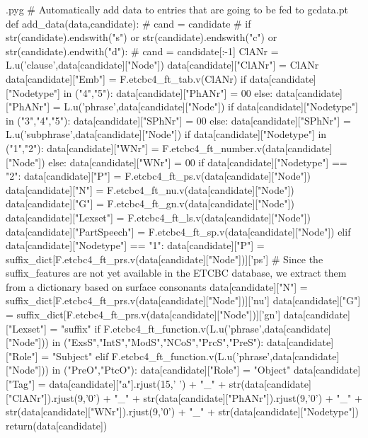 \documentclass{report}
\makeatletter
\newenvironment{python}{%
  \VerbatimEnvironment
  \minted@resetoptions
  \setkeys{minted@opt}{}
      \begin{VerbatimOut}{\jobname.pyg}}
{%
      \end{VerbatimOut}
      \minted@pygmentize{python}
      \DeleteFile{\jobname.pyg}}
\makeatother
\begin{document}
\begin{python}
# Automatically add data to entries that are going to be fed to gcdata.pt
def add_data(data,candidate):
#    cand = candidate
#    if str(candidate).endswith("s") or str(candidate).endswith("c") or str(candidate).endwith("d"):
#        cand = candidate[:-1]
    ClANr = L.u('clause',data[candidate]["Node"])
    data[candidate]["ClANr"] = ClANr
    data[candidate]["Emb"] = F.etcbc4_ft_tab.v(ClANr)
    if data[candidate]["Nodetype"] in ("4","5"):
        data[candidate]["PhANr"] = 00
    else:
        data[candidate]["PhANr"] = L.u('phrase',data[candidate]["Node"])
    if data[candidate]["Nodetype"] in ("3","4","5"):
        data[candidate]["SPhNr"] = 00
    else:
        data[candidate]["SPhNr"] = L.u('subphrase',data[candidate]["Node"])
    if data[candidate]["Nodetype"] in ("1","2"):
        data[candidate]["WNr"] = F.etcbc4_ft_number.v(data[candidate]["Node"])
    else:
        data[candidate]["WNr"] = 00
    if data[candidate]["Nodetype"] == "2":
        data[candidate]["P"] = F.etcbc4_ft_ps.v(data[candidate]["Node"])
        data[candidate]["N"] = F.etcbc4_ft_nu.v(data[candidate]["Node"])
        data[candidate]["G"] = F.etcbc4_ft_gn.v(data[candidate]["Node"])
        data[candidate]["Lexset"] = F.etcbc4_ft_ls.v(data[candidate]["Node"])
        data[candidate]["PartSpeech"] = F.etcbc4_ft_sp.v(data[candidate]["Node"])
    elif data[candidate]["Nodetype"] == "1":
        data[candidate]["P"] = suffix_dict[F.etcbc4_ft_prs.v(data[candidate]["Node"])]['ps']    # Since the suffix_features are not yet available in the ETCBC database, we extract them from a dictionary based on surface consonants
        data[candidate]["N"] = suffix_dict[F.etcbc4_ft_prs.v(data[candidate]["Node"])]['nu']
        data[candidate]["G"] = suffix_dict[F.etcbc4_ft_prs.v(data[candidate]["Node"])]['gn']
        data[candidate]["Lexset"] = "suffix"
        if F.etcbc4_ft_function.v(L.u('phrase',data[candidate]["Node"])) in ("ExsS","IntS","ModS","NCoS","PrcS","PreS"):
            data[candidate]["Role"] = "Subject"
        elif F.etcbc4_ft_function.v(L.u('phrase',data[candidate]["Node"])) in ("PreO","PtcO"):
            data[candidate]["Role"] = "Object"
    data[candidate]["Tag"] = data[candidate]["a"].rjust(15,' ') + "_" + str(data[candidate]["ClANr"]).rjust(9,'0') + "_" + str(data[candidate]["PhANr"]).rjust(9,'0') + "_" + str(data[candidate]["WNr"]).rjust(9,'0') + "_" + str(data[candidate]["Nodetype"])
    return(data[candidate])

\end{python}
\end{document}
